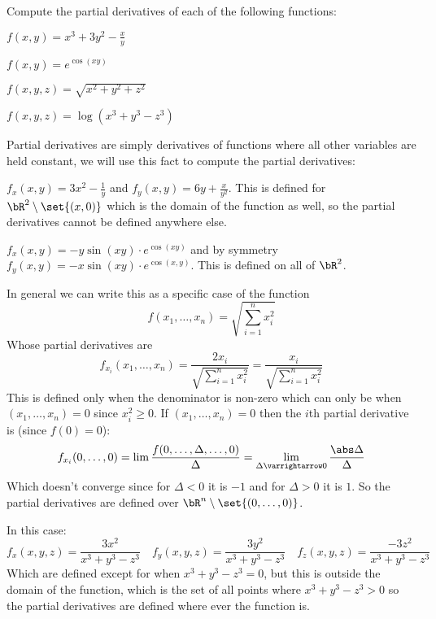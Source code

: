 \documentclass[10pt]{article}
\begin{document}


\bigskip

\begin{exercise*}

    Compute the partial derivatives of each of the following functions:
    \benum
        \item $f(x,y)=x^3+3y^2-\frac xy$
        \item $f(x,y)=e^{\cos(xy)}$
        \item $f(x,y,z)=\sqrt{x^2+y^2+z^2}$
        \item $f(x,y,z)=\log(x^3+y^3-z^3)$
    \eenum

\end{exercise*}

\begin{blankpp}

    \benum
        Partial derivatives are simply derivatives of functions where all other variables are held constant, we will use this fact to compute the partial derivatives:
        \item $f_x(x,y)=3x^2-\frac1y$ and $f_y(x,y)=6y+\frac x{y^2}$.
        This is defined for $\bR^2\setminus\set{(x,0)}$ which is the domain of the function as well, so the partial derivatives cannot be defined anywhere else.
        \item $f_x(x,y)=-y\sin(xy)\cdot e^{\cos(xy)}$ and by symmetry $f_y(x,y)=-x\sin(xy)\cdot e^{\cos(x,y)}$.
        This is defined on all of $\bR^2$.
        \item In general we can write this as a specific case of the function
        \[ f(x_1,\dots,x_n) = \sqrt{\sum_{i=1}^n x_i^2} \]
        Whose partial derivatives are
        \[ f_{x_i}(x_1,\dots,x_n) = \frac{2x_i}{\sqrt{\sum_{i=1}^n x_i^2}} = \frac{x_i}{\sqrt{\sum_{i=1}^n x_i^2}} \]
        This is defined only when the denominator is non-zero which can only be when $(x_1,\dots,x_n)=0$ since $x_i^2\geq0$.
        If $(x_1,\dots,x_n)=0$ then the $i$th partial derivative is (since $f(0)=0$):
        \[ f_{x_i}(0,\dots,0) = \lim\frac{f(0,\dots,\Delta,\dots,0)}{\Delta} = \lim_{\Delta\varrightarrow0}\frac{\abs\Delta}\Delta \]
        Which doesn't converge since for $\Delta<0$ it is $-1$ and for $\Delta>0$ it is $1$.
        So the partial derivatives are defined over $\bR^n\setminus\set{(0,\dots,0)}$.
        \item In this case:
        \[ f_x(x,y,z) = \frac{3x^2}{x^3+y^3-z^3} \quad f_y(x,y,z) = \frac{3y^2}{x^3+y^3-z^3} \quad f_z(x,y,z)=\frac{-3z^2}{x^3+y^3-z^3} \]
        Which are defined except for when $x^3+y^3-z^3=0$, but this is outside the domain of the function, which is the set of all points where $x^3+y^3-z^3>0$ so the partial derivatives are defined
        where ever the function is.
    \eenum

\end{blankpp}
\end{document}
